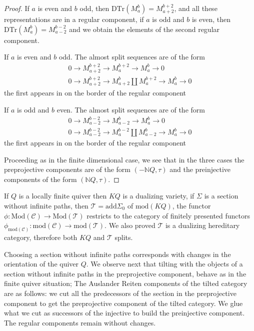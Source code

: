 \documentclass{amsart}
\theoremstyle{plain}
\numberwithin{equation}{section}
\begin{document}
\begin{proof}
If $a$ is even and $b$ odd, then $\mathrm{DTr}(M_{a}^{b})=M_{a+2}^{b+2}$,
and all these representations are in a regular component, if $a$ is odd and $b$ is even, then $\mathrm{DTr}(M_{a}^{b})=M_{a-2}^{b-2}$ and we obtain the
elements of the second regular component.

If $a$ is even and $b$ odd. The almost split sequences are of the form
\begin{eqnarray*}
0\rightarrow M_{a+2}^{b+2}\rightarrow M_{a}^{b+2}\rightarrow
M_{a}^{b}\rightarrow 0 \\
0\rightarrow M_{a+2}^{b+2}\rightarrow M_{a+2}^{b}\coprod
M_{a}^{b+2}\rightarrow M_{a}^{b}\rightarrow 0
\end{eqnarray*}
the first appears in on the border of the regular component

If $a$ is odd and $b$ even. The almost split sequences are of the form
\begin{eqnarray*}
0\rightarrow M_{a-2}^{b-2}\rightarrow M_{a-2}^b\rightarrow
M_{a}^{b}\rightarrow 0 \\
0\rightarrow M_{a-2}^{b-2}\rightarrow M_{a}^{b-2}\coprod
M_{a-2}^b\rightarrow M_{a}^{b}\rightarrow 0
\end{eqnarray*}
the first appears in on the border of the regular component

Proceeding as in the finite dimensional case, we see that in the three cases
the preprojective components are of the form $(-\mathbb{N}Q,\tau )$ and the
preinjective components of the form $(\mathbb{N}Q,\tau )$.
\end{proof}

If $Q$ is a locally finite quiver then $KQ$ is a dualizing variety, if $\Sigma $ is a section without infinite paths, then $\mathcal{T}=\mathrm{add}\Sigma _{0}$ of $\mathrm{mod}(KQ)$, the functor $\phi :\mathrm{\mathrm{Mod}}(\mathcal{C})\rightarrow \mathrm{\mathrm{Mod}}(\mathcal{T})$ restricts to the
category of finitely presented functors $\phi _{\mathrm{mod}(\mathcal{C})}:\mathrm{mod}(\mathcal{C})\rightarrow \mathrm{mod}(\mathcal{T})$. We also
proved $\mathcal{T}$ is a dualizing hereditary category, therefore both $KQ$
and $\mathcal{T}$ splits.

Choosing a section without infinite paths corresponds with changes in the
orientation of the quiver $Q$. We observe next that tilting with the objects
of a section without infinite paths in the preprojective component, behave
as in the finite quiver situation; The Auslander Reiten components of the
tilted category are as follows: we cut all the predecessors of the section
in the preprojective component to get the preprojective component of the
tilted category. We glue what we cut as successors of the injective to build
the preinjective component. The regular components remain without changes.
\end{document}

